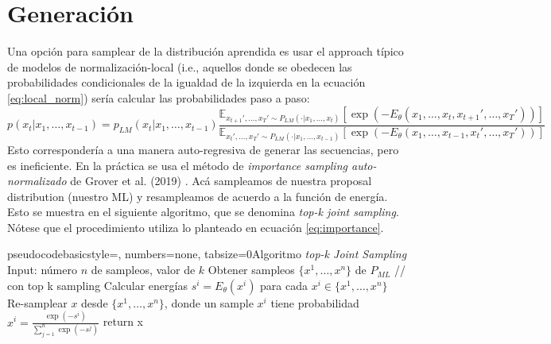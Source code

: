 \documentclass[letterpaper,11pt,oneside]{article}
\theoremstyle{break}
\begin{document}
\section{Generación}
Una opción para samplear de la distribución aprendida es usar el approach típico de modelos de normalización-local (i.e., aquellos donde se obedecen las probabilidades condicionales de la igualdad de la izquierda en la ecuación \ref{eq:local_norm}) sería calcular las probabilidades paso a paso:
\begin{equation}
\label{eq:topk_autoreg}
    p(x_t|x_1,\dots,x_{t-1}) = p_{LM}(x_t|x_1,\dots,x_{t-1})\frac{\mathbb{E}_{x_{t+1}',\dots,x_T'\sim P_{LM}(\cdot|x_1,\dots,x_t)}[\exp(-E_\theta(x_1,\dots,x_t,x_{t+1}',\dots,x_T'))]}{\mathbb{E}_{x_t',\dots,x_T'\sim P_{LM}(\cdot|x_1,\dots,x_{t-1})}[\exp(-E_\theta(x_1,\dots,x_{t-1},x_t',\dots,x_T'))]}
\end{equation}
Esto correspondería a una manera auto-regresiva de generar las secuencias, pero es ineficiente. En la práctica se usa el método de \textit{importance sampling auto-normalizado} de Grover et al. (2019) \cite{grover}. Acá sampleamos de nuestra proposal distribution (nuestro ML) y resampleamos de acuerdo a la función de energía. Esto se muestra en el siguiente algoritmo, que se denomina \textit{top-k joint sampling}. Nótese que el procedimiento utiliza lo planteado en ecuación \ref{eq:importance}.

\begin{sourcecodep}[]{pseudocode}{basicstyle={\fontsize{9}{16}\selectfont\ttfamily}, numbers=none, tabsize=0}{Algoritmo \textit{top-k Joint Sampling}}
Input: número $n$ de sampleos, valor de $k$
Obtener sampleos $\{x^1,\dots,x^n\}$ de $P_{ML}$  // con top k sampling 
Calcular energías $s^i = E_\theta(x^i)$ para cada $x^i\in\{x^1,\dots,x^n\}$
Re-samplear $x$ desde $\{x^1,\dots,x^n\}$, donde un sample $x^i$ tiene probabilidad $x^i=\frac{\exp(-s^i)}{\sum^n_{j=1}\exp(-s^j)}$
return x
\end{sourcecodep}
\end{document}
